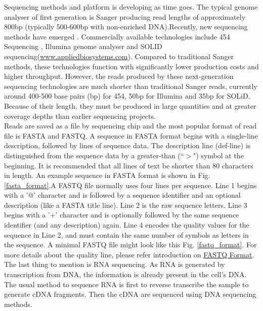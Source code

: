 \documentclass{article}
\begin{document}
\noindent Sequencing methods and platform is developing as time goes. The typical genome analyser of first generation is Sanger\cite{sanger1977nucleotide} producing read lengths of approximately 800bp (typically 500-600bp with non-enriched DNA).Recently, new sequencing methods have emerged \cite{mardis2008impact}. Commercially available technologies include 454 Sequencing \cite{margulies2005genome}, Illumina genome analyser \cite{bentley2006whole} and SOLID sequencing(\href{www.appliedbiosystems.com}{www.appliedbiosystems.com}). Compared to traditional Sanger methods, these technologies function with significantly lower production costs and higher throughput. However, the reads produced by these next-generation sequencing technologies are much shorter than traditional Sanger reads, currently around 400-500 base pairs (bp) for 454, 50bp for Illumina and 35bp for SOLiD. Because of their length, they must be produced in large quantities and at greater coverage depths than earlier sequencing projects.\\
Reads are saved as a file by sequencing chip and the most popular format of read file is FASTA and FASTQ. A sequence in FASTA format begins with a single-line description, followed by lines of sequence data. The description line (def-line) is distinguished from the sequence data by a greater-than (``$>$") symbol at the beginning. It is recommended that all lines of text be shorter than 80 characters in length. An example sequence in FASTA format is shown in Fig. \ref{fasta_format}.A FASTQ file normally uses four lines per sequence. Line 1 begins with a '@' character and is followed by a sequence identifier and an optional description (like a FASTA title line). Line 2 is the raw sequence letters. Line 3 begins with a '+' character and is optionally followed by the same sequence identifier (and any description) again. Line 4 encodes the quality values for the sequence in Line 2, and must contain the same number of symbols as letters in the sequence. A minimal FASTQ file might look like this Fig. \ref{fastq_format}. For more details about the quality line, please refer introduction on \href{http://en.wikipedia.org/wiki/FASTQ_format}{FASTQ Format}.\\
The last thing to mention is RNA sequencing. As RNA is generated by transcription from DNA, the information is already present in the cell's DNA. The usual method to sequence RNA is first to reverse transcribe the sample to generate cDNA fragments. Then the cDNA are sequenced using DNA sequencing methods.\\
\end{document}

